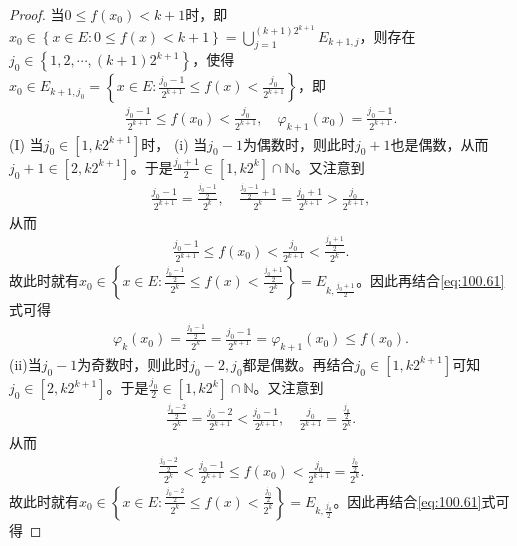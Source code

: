 \documentclass[../../main.tex]{subfiles}%
\begin{document}
\begin{proof}
\one 当$0\leqslant f\left( x_0 \right) <k + 1$时，即$x_0\in \left\{ x\in E:0\leqslant f\left( x \right) <k + 1 \right\} =\bigcup_{j = 1}^{(k + 1)2^{k + 1}}E_{k + 1,j}$，则存在$j_0\in \left\{ 1,2,\cdots,(k + 1)2^{k + 1} \right\}$，使得$x_0\in E_{k + 1,j_0}=\left\{ x\in E:\frac{j_0 - 1}{2^{k + 1}}\leqslant f\left( x \right) <\frac{j_0}{2^{k + 1}} \right\}$，即
\begin{align}
\frac{j_0 - 1}{2^{k + 1}}\leqslant f\left( x_0 \right) <\frac{j_0}{2^{k + 1}}, \quad \varphi _{k + 1}\left( x_0 \right) =\frac{j_0 - 1}{2^{k + 1}}. \label{eq:100.61}
\end{align}
(I) 当$j_0\in \left[ 1,k2^{k + 1} \right]$时，
(i) 当$j_0 - 1$为偶数时，则此时$j_0 + 1$也是偶数，从而$j_0 + 1\in \left[ 2,k2^{k + 1} \right]$。于是$\frac{j_0 + 1}{2}\in \left[ 1,k2^k \right] \cap \mathbb{N}$。又注意到
\begin{align*}
\frac{j_0 - 1}{2^{k + 1}}=\frac{\frac{j_0 - 1}{2}}{2^k}, \quad \frac{\frac{j_0 - 1}{2}+1}{2^k}=\frac{j_0 + 1}{2^{k + 1}}>\frac{j_0}{2^{k + 1}},
\end{align*}
从而
\begin{align*}
\frac{j_0 - 1}{2^{k + 1}}\leqslant f\left( x_0 \right) <\frac{j_0}{2^{k + 1}}<\frac{\frac{j_0 + 1}{2}}{2^k}.
\end{align*}
故此时就有$x_0\in \left\{ x\in E:\frac{\frac{j_0 - 1}{2}}{2^k}\leqslant f\left( x \right) <\frac{\frac{j_0 + 1}{2}}{2^k} \right\} =E_{k,\frac{j_0 + 1}{2}}$。因此再结合\eqref{eq:100.61}式可得
\begin{align*}
\varphi _k\left( x_0 \right) =\frac{\frac{j_0 - 1}{2}}{2^k}=\frac{j_0 - 1}{2^{k + 1}}=\varphi _{k + 1}\left( x_0 \right) \leqslant f\left( x_0 \right).
\end{align*}
(ii)当$j_0 - 1$为奇数时，则此时$j_0 - 2,j_0$都是偶数。再结合$j_0\in \left[ 1,k2^{k + 1} \right]$可知$j_0\in \left[ 2,k2^{k + 1} \right]$。于是$\frac{j_0}{2}\in \left[ 1,k2^k \right] \cap \mathbb{N}$。又注意到
\begin{align*}
\frac{\frac{j_0 - 2}{2}}{2^k}=\frac{j_0 - 2}{2^{k + 1}}<\frac{j_0 - 1}{2^{k + 1}}, \quad \frac{j_0}{2^{k + 1}}=\frac{\frac{j_0}{2}}{2^k}.
\end{align*}
从而
\begin{align*}
\frac{\frac{j_0 - 2}{2}}{2^k}<\frac{j_0 - 1}{2^{k + 1}}\leqslant f\left( x_0 \right) <\frac{j_0}{2^{k + 1}}=\frac{\frac{j_0}{2}}{2^k}.
\end{align*}
故此时就有$x_0\in \left\{ x\in E:\frac{\frac{j_0 - 2}{2}}{2^k}\leqslant f\left( x \right) <\frac{\frac{j_0}{2}}{2^k} \right\} =E_{k,\frac{j_0}{2}}$。因此再结合\eqref{eq:100.61}式可得

\end{proof}
\end{document}
